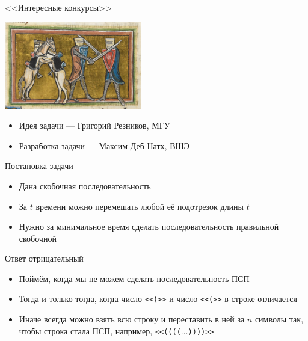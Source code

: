 \begin{frame}
  \begin{center}
    \LARGE <<Интересные конкурсы>>
  \end{center}

      \begin{center}
      \includegraphics[width=6cm]{memes/a-meme.jpg}
  \end{center}


  \begin{itemize}
  \item Идея задачи --- Григорий Резников, МГУ
  \item Разработка задачи --- Максим Деб Натх, ВШЭ
  \end{itemize}

\end{frame}

\begin{frame}{Постановка задачи}

  \begin{itemize}
  \item Дана скобочная последовательность
  \item За $t$ времени можно перемешать любой её подотрезок длины $t$
  \item Нужно за минимальное время сделать последовательность правильной скобочной
  \end{itemize}
  
\end{frame}

\begin{frame}{Ответ отрицательный}
  \begin{itemize}
  \item Поймём, когда мы не можем сделать последовательность ПСП
  \item Тогда и только тогда, когда число \texttt{<<(>>} и число \texttt{<<(>>} в строке отличается
  \item Иначе всегда можно взять всю строку и переставить в ней за $n$ символы так, чтобы строка стала ПСП, например, \texttt{<<(((($\dots$))))>>}
  \end{itemize}
\end{frame}

